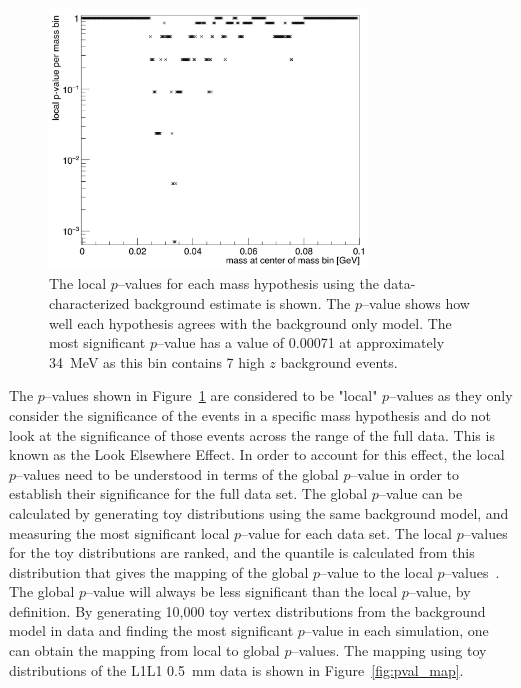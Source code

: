 \begin{figure}[htb]
  \centering
      \includegraphics[width=0.75\textwidth]{pics/results/highz_pval.png}
  \caption[Local $p$--values for the L1L1 dataset]{The local $p$--values for each mass hypothesis using the data-characterized background estimate is shown. The $p$--value shows how well each hypothesis agrees with the background only model. The most significant $p$--value has a value of 0.00071 at approximately 34~MeV as this bin contains 7 high $z$ background events.}
  \label{fig:highz_pval}
\end{figure} 

The $p$--values shown in Figure~\ref{fig:highz_pval} are considered to be "local" $p$--values as they only consider the significance of the events in a specific mass hypothesis and do not look at the significance of those events across the range of the full data. This is known as the Look Elsewhere Effect. In order to account for this effect, the local $p$--values need to be understood in terms of the global $p$--value in order to establish their significance for the full data set. The global $p$--value can be calculated by generating toy distributions using the same background model, and measuring the most significant local $p$--value for each data set. The local $p$--values for the toy distributions are ranked, and the quantile is calculated from this distribution that gives the mapping of the global $p$--value to the local $p$--values~\cite{gross_trial_2010}. The global $p$--value will always be less significant than the local $p$--value, by definition. By generating 10,000 toy vertex distributions from the background model in data and finding the most significant $p$--value in each simulation, one can obtain the mapping from local to global $p$--values. The mapping using toy distributions of the L1L1 0.5~mm data is shown in Figure~\ref{fig:pval_map}.

